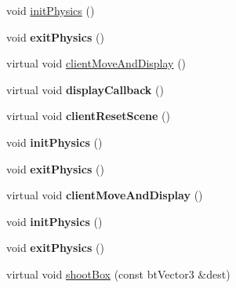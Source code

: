 \begin{DoxyCompactItemize}
\item 
void \hyperlink{class_basic_demo_a76bff55d9633b81f16a3ae0b04d73851}{init\+Physics} ()
\item 
\hypertarget{class_basic_demo_a9c98756c4dc92b6a39ba0b3440e4c6fd}{void {\bfseries exit\+Physics} ()}\label{class_basic_demo_a9c98756c4dc92b6a39ba0b3440e4c6fd}

\item 
virtual void \hyperlink{class_basic_demo_ac34eb0c6bfc596c751847d79921e355c}{client\+Move\+And\+Display} ()
\item 
\hypertarget{class_basic_demo_a7451422f15dd8f950ac71a07b0a1dfd2}{virtual void {\bfseries display\+Callback} ()}\label{class_basic_demo_a7451422f15dd8f950ac71a07b0a1dfd2}

\item 
\hypertarget{class_basic_demo_ace4a0e6967f3706a8c9ed5c23f6a4828}{virtual void {\bfseries client\+Reset\+Scene} ()}\label{class_basic_demo_ace4a0e6967f3706a8c9ed5c23f6a4828}

\item 
\hypertarget{class_basic_demo_a76bff55d9633b81f16a3ae0b04d73851}{void {\bfseries init\+Physics} ()}\label{class_basic_demo_a76bff55d9633b81f16a3ae0b04d73851}

\item 
\hypertarget{class_basic_demo_a9c98756c4dc92b6a39ba0b3440e4c6fd}{void {\bfseries exit\+Physics} ()}\label{class_basic_demo_a9c98756c4dc92b6a39ba0b3440e4c6fd}

\item 
\hypertarget{class_basic_demo_a57d3b919ccd45f452e087dce05a725a5}{virtual void {\bfseries client\+Move\+And\+Display} ()}\label{class_basic_demo_a57d3b919ccd45f452e087dce05a725a5}

\item 
\hypertarget{class_basic_demo_a76bff55d9633b81f16a3ae0b04d73851}{void {\bfseries init\+Physics} ()}\label{class_basic_demo_a76bff55d9633b81f16a3ae0b04d73851}

\item 
\hypertarget{class_basic_demo_a9c98756c4dc92b6a39ba0b3440e4c6fd}{void {\bfseries exit\+Physics} ()}\label{class_basic_demo_a9c98756c4dc92b6a39ba0b3440e4c6fd}

\item 
\hypertarget{class_basic_demo_a060b867cdc160af0bbf7df529b5f2bda}{virtual void \hyperlink{class_basic_demo_a060b867cdc160af0bbf7df529b5f2bda}{shoot\+Box} (const bt\+Vector3 \&dest)}\label{class_basic_demo_a060b867cdc160af0bbf7df529b5f2bda}


\end{DoxyCompactItemize}
